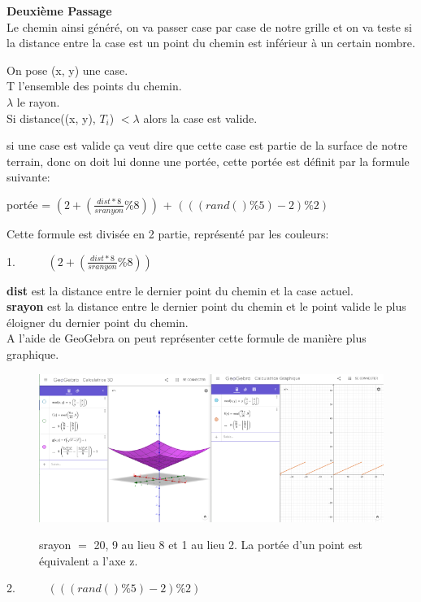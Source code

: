\documentclass{article}
\begin{document}
\textbf{\Large{Deuxième Passage}}\\
Le chemin ainsi généré, on va passer case par case de notre grille et on va teste si la distance entre la case est un point du chemin est inférieur à un certain nombre.
\begin{center}
On pose (x, y) une case.\\
T l'ensemble des points du chemin.\\
$\lambda$ le rayon.\\
Si distance((x, y), $T_i$) $< \lambda$ alors la case est valide.
\end{center}
si une case est valide ça veut dire que cette case est partie de la surface de notre terrain, donc on doit lui donne une portée, cette portée est définit par la formule suivante:
\begin{center}
	portée = {\color{color1}$(2 + (\frac{dist*8}{sranyon}\%8))$} + 
	{\color{color2}$(((rand()\%5)-2)\%2)$}
\end{center}
Cette formule est divisée en 2 partie, représenté par les couleurs:
\begin{center}
	1.~~~~~ $(2 + (\frac{dist*8}{sranyon}\%8))$
\end{center}
\textbf{dist} est la distance entre le dernier point du chemin et la case actuel.\\
\textbf{srayon} est la distance entre le dernier point du chemin et le point valide le plus éloigner du dernier point du chemin.\\
A l'aide de GeoGebra on peut représenter cette formule de manière plus graphique.\\
\begin{figure}[!h]
\centering
 \includegraphics[scale=0.5]{Images/Geogebraimg1.png}\\
 \caption{srayon $=$ 20, 9 au lieu 8 et 1 au lieu 2. La portée d'un point est équivalent a l'axe z.}
\end{figure} 
\begin{center}
	2.~~~~~ $(((rand()\%5)-2)\%2)$\\
\end{center}
\end{document}
